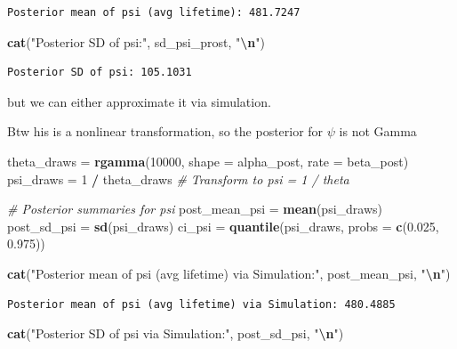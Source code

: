\documentclass[
]{article}
\newenvironment{Shaded}{\begin{snugshade}}{\end{snugshade}}
\newcommand{\AttributeTok}[1]{\textcolor[rgb]{0.13,0.29,0.53}{#1}}
\newcommand{\CommentTok}[1]{\textcolor[rgb]{0.56,0.35,0.01}{\textit{#1}}}
\newcommand{\DecValTok}[1]{\textcolor[rgb]{0.00,0.00,0.81}{#1}}
\newcommand{\FloatTok}[1]{\textcolor[rgb]{0.00,0.00,0.81}{#1}}
\newcommand{\FunctionTok}[1]{\textcolor[rgb]{0.13,0.29,0.53}{\textbf{#1}}}
\newcommand{\NormalTok}[1]{#1}
\newcommand{\OtherTok}[1]{\textcolor[rgb]{0.56,0.35,0.01}{#1}}
\newcommand{\SpecialCharTok}[1]{\textcolor[rgb]{0.81,0.36,0.00}{\textbf{#1}}}
\newcommand{\StringTok}[1]{\textcolor[rgb]{0.31,0.60,0.02}{#1}}
\begin{document}
\begin{verbatim}
Posterior mean of psi (avg lifetime): 481.7247 
\end{verbatim}

\begin{Shaded}
\begin{Highlighting}[]
\FunctionTok{cat}\NormalTok{(}\StringTok{"Posterior SD of psi:"}\NormalTok{, sd\_psi\_prost, }\StringTok{"}\SpecialCharTok{\textbackslash{}n}\StringTok{"}\NormalTok{)}
\end{Highlighting}
\end{Shaded}

\begin{verbatim}
Posterior SD of psi: 105.1031 
\end{verbatim}

but we can either approximate it via simulation.

Btw his is a nonlinear transformation, so the posterior for \(\psi\) is
not Gamma

\begin{Shaded}
\begin{Highlighting}[]
\NormalTok{theta\_draws }\OtherTok{=} \FunctionTok{rgamma}\NormalTok{(}\DecValTok{10000}\NormalTok{, }\AttributeTok{shape =}\NormalTok{ alpha\_post, }\AttributeTok{rate =}\NormalTok{ beta\_post)}
\NormalTok{psi\_draws }\OtherTok{=} \DecValTok{1} \SpecialCharTok{/}\NormalTok{ theta\_draws }\CommentTok{\# Transform to psi = 1 / theta}

\CommentTok{\# Posterior summaries for psi}
\NormalTok{post\_mean\_psi }\OtherTok{=} \FunctionTok{mean}\NormalTok{(psi\_draws)}
\NormalTok{post\_sd\_psi }\OtherTok{=} \FunctionTok{sd}\NormalTok{(psi\_draws)}
\NormalTok{ci\_psi }\OtherTok{=} \FunctionTok{quantile}\NormalTok{(psi\_draws, }\AttributeTok{probs =} \FunctionTok{c}\NormalTok{(}\FloatTok{0.025}\NormalTok{, }\FloatTok{0.975}\NormalTok{))}

\FunctionTok{cat}\NormalTok{(}\StringTok{"Posterior mean of psi (avg lifetime) via Simulation:"}\NormalTok{, post\_mean\_psi, }\StringTok{"}\SpecialCharTok{\textbackslash{}n}\StringTok{"}\NormalTok{)}
\end{Highlighting}
\end{Shaded}

\begin{verbatim}
Posterior mean of psi (avg lifetime) via Simulation: 480.4885 
\end{verbatim}

\begin{Shaded}
\begin{Highlighting}[]
\FunctionTok{cat}\NormalTok{(}\StringTok{"Posterior SD of psi via Simulation:"}\NormalTok{, post\_sd\_psi, }\StringTok{"}\SpecialCharTok{\textbackslash{}n}\StringTok{"}\NormalTok{)}
\end{Highlighting}
\end{Shaded}
\end{document}

